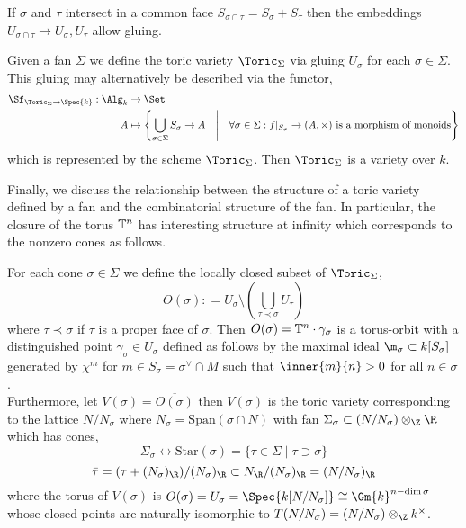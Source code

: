 \documentclass[12pt]{article}
\begin{document}
\begin{remark}
If $\sigma$ and $\tau$ intersect in a common face $S_{\sigma \cap \tau} = S_\sigma + S_\tau$ then the embeddings $U_{\sigma \cap \tau} \to U_{\sigma}, U_{\tau}$ allow gluing. 
\end{remark}


\begin{definition}
Given a fan $\Sigma$ we define the toric variety $\Toric_\Sigma$ via gluing $U_\sigma$ for each $\sigma \in \Sigma$. This gluing may alternatively be described via the functor,
\begin{align*}
\Sf_{\Toric_\Sigma \to \Spec{k}} : \Alg_k & \to \Set
\\
A & \mapsto \left\{ \bigcup_{\sigma \in \Sigma} S_\sigma \to A \quad \middle| \quad \forall \sigma \in \Sigma : f|_{S_\sigma} \to (A, \times) \text{ is a morphism of monoids} \right\} 
\end{align*}
which is represented by the scheme $\Toric_\Sigma$. Then $\Toric_\Sigma$ is a variety over $k$.
\end{definition}

Finally, we discuss the relationship between the structure of a toric variety defined by a fan and the combinatorial structure of the fan. In particular, the closure of the torus $\mathbb{T}^n$ has interesting structure at infinity which corresponds to the nonzero cones as follows.

\begin{prop}
For each cone $\sigma \in \Sigma$ we define the locally closed subset of $\Toric_\Sigma$,
\[ O(\sigma) : = U_\sigma \setminus \left( \bigcup_{\tau \prec \sigma} U_\tau \right) \]
where $\tau \prec \sigma$ if $\tau$ is a proper face of $\sigma$. Then $O(\sigma) = \mathbb{T}^n \cdot \gamma_\sigma$ is a torus-orbit with a distinguished point $\gamma_\sigma \in U_\sigma$ defined as follows by the maximal ideal $\m_\sigma \subset k[S_\sigma]$ generated by $\chi^m$ for $m \in S_\sigma = \sigma^\vee \cap M$ such that $\inner{m}{n} > 0$ for all $n \in \sigma$.
\bigskip\\
Furthermore, let $V(\sigma) = \overline{O(\sigma)}$ then $V(\sigma)$ is the toric variety corresponding to the lattice $N / N_\sigma$ where $N_\sigma = \mathrm{Span}(\sigma \cap N)$ with fan $\Sigma_\sigma \subset (N/N_\sigma) \otimes_\Z \R$ which has cones,
\[ \Sigma_\sigma \leftrightarrow \mathrm{Star}(\sigma) = \{ \tau \in \Sigma \mid \tau \supset \sigma \} \]
\[ \bar{\tau} = (\tau + (N_\sigma)_\R)/ (N_\sigma)_\R \subset N_\R / (N_\sigma)_\R = (N/ N_\sigma)_\R \]
where the torus of $V(\sigma)$ is $O(\sigma) = U_{\bar{\sigma}} = \Spec{k[N/N_\sigma]} \cong \Gm{k}^{n - \dim{\sigma}}$ whose closed points are naturally isomorphic to $T(N/N_\sigma) = (N / N_\sigma) \otimes_\Z k^\times$. 
\end{prop}
\end{document}
